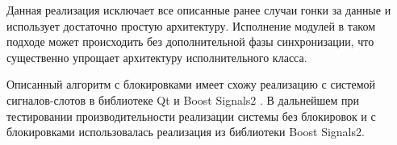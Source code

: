 Данная реализация исключает все описанные ранее случаи гонки за данные и использует достаточно простую архитектуру. Исполнение модулей в таком подходе может происходить без дополнительной фазы синхронизации, что существенно упрощает архитектуру исполнительного класса.

Описанный алгоритм с блокировками имеет схожу реализацию с системой сигналов-слотов в библиотеке Qt и Boost Signals2 \cite{schaling2011boost}. В дальнейшем при тестировании производительности реализации системы без блокировок и с блокировками использовалась реализация из библиотеки Boost Signals2.

